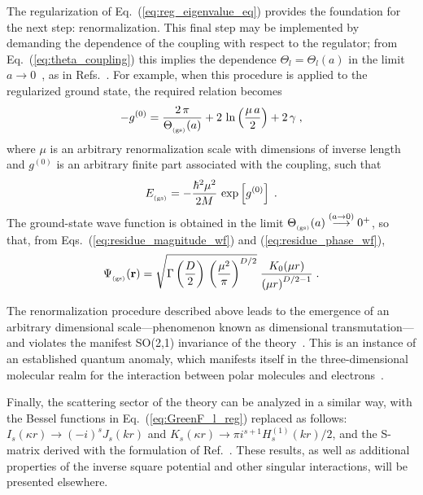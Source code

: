 \documentclass[a4paper,preprint,draft,showpacs,amsmath,amsfonts,amssymb,aps,prd]{revtex4}%
\begin{document}
The regularization of 
Eq.~(\ref{eq:reg_eigenvalue_eq})
provides the foundation for the next step: renormalization.
This final step may be implemented by
demanding the dependence of the coupling with respect to the
regulator; from Eq.~(\ref{eq:theta_coupling})
this implies the dependence
 $\Theta_{l}=\Theta_{l} (a)$
in the limit $a \rightarrow 0$~\cite{running_coupling}, 
as in Refs.~\cite{gup:93,cam:00,cam:01}. 
For example, when this procedure is applied to the regularized ground state,
the required relation becomes
\begin{equation}
- 
g^{(0)}
=
\frac{2 \, \pi}{ \Theta_{_{\rm (gs)}} (a) } +
2 \, \ln \left( \frac{\mu \, a}{2} \right)
+ 2 \, \gamma
\;  ,
\label{eq:cutoff_BS_regularized_relation}
\end{equation}
where $\mu$ is an arbitrary
renormalization scale with dimensions of inverse length
and $g^{(0)}$ is an arbitrary finite part associated with the
coupling, such that
\begin{equation}
E_{_{\rm (gs)}}
=
- 
\frac{\hbar^{2}
\mu^{2}}{2M}
\,
\exp \left[
g^{(0)} 
\right]
\;  .
\label{eq:ISP_GS}
\end{equation}
The ground-state wave function 
is obtained in the limit
$\Theta_{_{\rm (gs)}}    (a) 
 \stackrel{(a \rightarrow 0 )}{\longrightarrow} 
0^{+}$, so that,
from Eqs.~(\ref{eq:residue_magnitude_wf})
and (\ref{eq:residue_phase_wf}),
\begin{equation}
\Psi_{_{\rm (gs)}}
 ({\bf r})
=
\sqrt{
\Gamma \left( \frac{D}{2} \right) \,
\left( 
\frac{\mu^{2}}{\pi}
\right)^{D/2}
}
\;
\frac{K_{0} (\mu r)}
{ \left( \mu r \right)^{D/2 -1} }
\;  .
\label{eq:ISP_wf_normalized_renormalized}
\end{equation}

The renormalization
procedure described above leads to the emergence of an arbitrary 
dimensional scale---phenomenon known as dimensional transmutation---and 
violates the manifest SO(2,1) invariance of the 
theory~\cite{jac:72,alf:76,jac:80,cam:01b}. This is
an instance of an established 
quantum anomaly, which manifests itself in the
three-dimensional molecular realm 
for the interaction between polar molecules and electrons~\cite{cam:01b}.

Finally, the scattering sector of the theory can be analyzed in a similar way,
with the Bessel functions in Eq.~(\ref{eq:GreenF_l_reg})
replaced as follows:
$I_{s} (\kappa r) 
\rightarrow  
(-i)^{s}
J_{s} (k r) $
and
$K_{s} (\kappa r) 
\rightarrow 
\pi i^{s+1}H^{(1)}_{s} (k r)/2 $, 
and the S-matrix derived with the formulation
of Ref.~\cite{ger:80}. 
These results, as well as additional properties of the inverse square potential
and other singular interactions, will be presented elsewhere.
\end{document}
